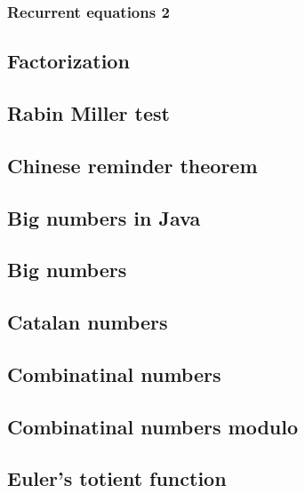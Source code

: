 \documentclass[a4paper]{article}
\begin{document}
\begin{multicols*}{2}
        \subsubsection{Recurrent equations 2}
            
    \subsection{Factorization}
        
    \subsection{Rabin Miller test}
        
    \subsection{Chinese reminder theorem}
        
    \subsection{Big numbers in Java}
        
    \subsection{Big numbers}
        
    \subsection{Catalan numbers}
        
    \subsection{Combinatinal numbers}
        
    \subsection{Combinatinal numbers modulo}
        
    \subsection{Euler's totient function}
        

\end{multicols*}
\end{document}
